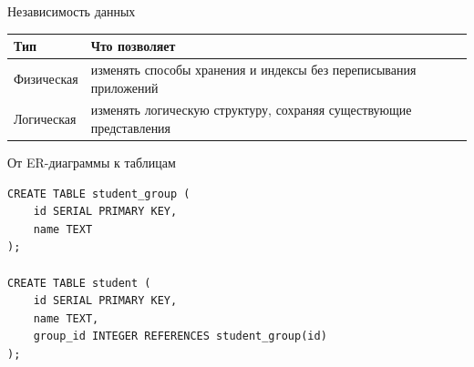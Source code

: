 \documentclass[aspectratio=169]{beamer}
\begin{document}
\begin{frame}{Независимость данных}

\begin{table}
\centering
\begin{tabular}{p{}|p{}}
\toprule
\textbf{Тип} & \textbf{Что позволяет}\\
\midrule
Физическая &
изменять способы хранения и индексы
без переписывания приложений\\
Логическая &
изменять логическую структуру,
сохраняя существующие представления\\
\bottomrule
\end{tabular}
\end{table}

\end{frame}


\begin{frame}[fragile]{От ER-диаграммы к таблицам}

\begin{center}
\end{center}

\small
\begin{verbatim}
CREATE TABLE student_group (
    id SERIAL PRIMARY KEY,
    name TEXT
);

CREATE TABLE student (
    id SERIAL PRIMARY KEY,
    name TEXT,
    group_id INTEGER REFERENCES student_group(id)
);
\end{verbatim}

\end{frame}
\end{document}
